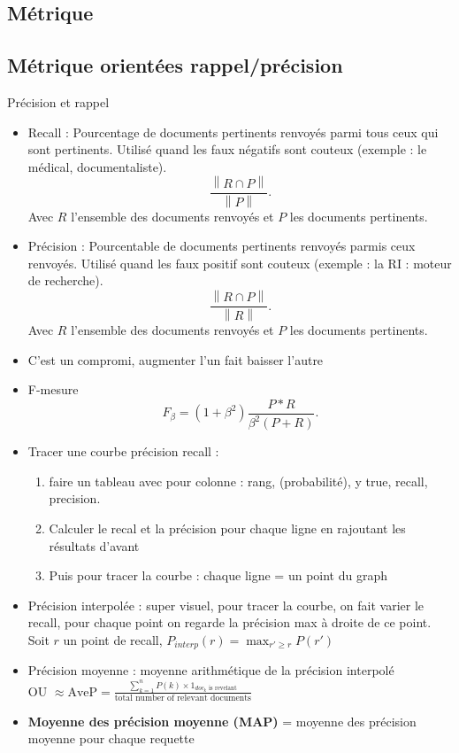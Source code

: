 \documentclass{article}
\begin{document}
\begin{multicols}{2}
\section{Métrique}
\subsection{Métrique orientées rappel/précision}
Précision et rappel
\begin{itemize}
    \item Recall : Pourcentage de documents pertinents renvoyés parmi tous ceux qui sont pertinents. Utilisé quand les faux négatifs sont couteux (exemple : le médical, documentaliste).
    \[
        \frac{\left\| R \cap P \right\| }{\left\| P \right\| }
    .\]
    Avec $ R $ l'ensemble des documents renvoyés et $ P $ les documents pertinents. 

    \item Précision : Pourcentable de documents pertinents renvoyés parmis ceux renvoyés. Utilisé quand les faux positif sont couteux (exemple : la RI : moteur de recherche).
    \[
        \frac{\left\| R \cap P \right\| }{\left\| R \right\| }
    .\]
    Avec $ R $ l'ensemble des documents renvoyés et $ P $ les documents pertinents.

    \item C'est un compromi, augmenter l'un fait baisser l'autre
    \item F-mesure 
    \[
        F_\beta = (1 + \beta ^2) \frac{P * R}{\beta ^2 (P+R)}
    .\]

    \item Tracer une courbe précision recall : \begin{enumerate}
        \item faire un tableau avec pour colonne : rang, (probabilité), y true, recall, precision.
        \item Calculer le recal et la précision pour chaque ligne en rajoutant les résultats d'avant
        \item Puis pour tracer la courbe : chaque ligne = un point du graph
    \end{enumerate}
    
    \item Précision interpolée : super visuel, pour tracer la courbe, on fait varier le recall, pour chaque point on regarde la précision max à droite de ce point. Soit $ r $  un point de recall, $ P_{interp}(r) = \max _{r' \geq r} P(r') $ 
    
    \item Précision moyenne : moyenne arithmétique de la précision interpolé \\
    OU $ \approx \text{AveP} = \frac{\sum_{k=1}^n P(k) \times {1}_{doc_k \text{ is revelant}}} {\text{total number of relevant documents}}$ 
    \item \textbf{Moyenne des précision moyenne (MAP)} = moyenne des précision moyenne pour chaque requette
    

\end{itemize}
\end{multicols}
\end{document}
